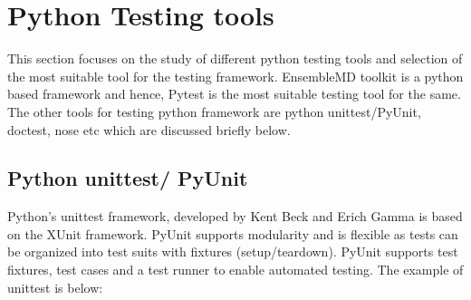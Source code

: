 \documentclass[10pt]{ruthesis}
\begin{document}

\section{Python Testing tools}
This section focuses on the study of different python testing tools and selection of the most suitable tool for the testing framework. EnsembleMD toolkit is a python based framework and hence, Pytest is the most suitable testing tool for the same. The other tools for testing python framework are python unittest/PyUnit, doctest, nose etc which are discussed briefly below.

\subsection{Python unittest/ PyUnit}
Python's unittest framework, developed by Kent Beck and Erich Gamma is based on the XUnit framework. PyUnit supports modularity and is flexible as tests can be organized into test suits with fixtures (setup/teardown). PyUnit supports test fixtures, test cases and a test runner to enable automated testing. The example of unittest is below:
\end{document}
